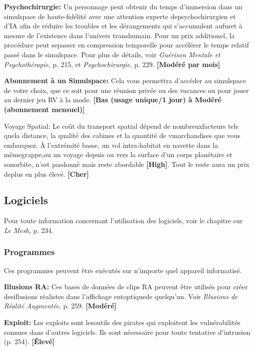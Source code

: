 \textbf{Psychochirurgie:} Un personnage peut obtenir du temps d'immersion dans un simulspace de haute-fidélité avec une attention experte depsychochirurgien et d'IA afin de réduire les troubles et les dérangements qui s'accumulent aufuret à mesure de l'existence dans l'univers transhumain. Pour un prix additionel, la procédure peut sepasser en compression temporelle pour accélérer le temps relatif passé dans le simulspace. Pour plus de détails, voir \emph{Guérison Mentale et Psychothérapie}, p. 215, et \emph{Psychochirurgie}, p. 229. \textbf{[Modéré par mois]} 

\textbf{Abonnement à un Simulspace:} Cela vous permettra d'accéder au simulspace de votre choix, que ce soit pour une réunion privée ou des vacances ou pour jouer au dernier jeu RV à la mode. \textbf{[Bas (usage unique/1 jour) à  Modéré (abonnement mensuel)]} 

Voyage Spatial: Le coût du transport spatial dépend de nombreuxfacteurs tels quela distance, la qualité des cabines et la quantité de vmarchandises que vous embarquez. À l'extrémité basse, un vol intra-habitat en navette dans la mêmegrappe,ou un voyage depuis ou vers la surface d'un corps planétaire et sonorbite, n'est pasdonné mais reste abordable \textbf{[High]}. Tout le reste aura un prix deplus en plus élevé. \textbf{[Cher]} 

\subsection{Logiciels} \label{sec:software} 

Pour toute information concernant l'utilisation des logiciels, voir le chapitre sur \emph{Le Mesh}, p. 234. 

\subsubsection{Programmes} 

Ces programmes peuvent être exécutés sur n'importe quel appareil informatisé. 

\textbf{Illusions RA: }Ces bases de données de clips RA peuvent être utilisés pour créer desillusions réalistes dans l'affichage entoptiquede quelqu'un. Voir \emph{Illusions de Réalité Augmentée}, p. 259. \textbf{[Modéré]} 

\textbf{Exploit:} Les exploits sont lesoutils des pirates qui exploitent les vulnérabilités connues dans d'autres logiciels. Ils sont nécessaire pour toute tentative d'intrusion (p. 254). \textbf{[Élevé]} 

